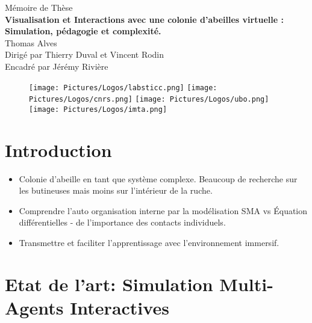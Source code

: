 \documentclass[10pt,a4paper]{article}
\begin{document}
	\begin{titlepage}
		\begin{center}
		\Large Mémoire de Thèse\\
		\vspace{4em}
		\LARGE\textbf{Visualisation et Interactions avec une colonie d'abeilles virtuelle :\\}
		\vspace{1em}
		\Large\textbf{Simulation, pédagogie et complexité.\\}		
		\vspace{8em}
		\LARGE Thomas Alves\\
		\vspace{8em}
		\Large Dirigé par Thierry Duval et Vincent Rodin\\
		Encadré par Jérémy Rivière\\
		\vspace{7em}
		\begin{figure}[!h]
		\centering
		\texttt{[image: Pictures/Logos/labsticc.png]}
		\hspace{0.4cm}
		\texttt{[image: Pictures/Logos/cnrs.png]}
		\hspace{0.4cm}
		\texttt{[image: Pictures/Logos/ubo.png]}
		\hspace{0.4cm}
		\texttt{[image: Pictures/Logos/imta.png]}
		\end{figure}
		\end{center}	 
	\end{titlepage}
	
\tableofcontents
	
\section{Introduction}
\begin{itemize}
	\item Colonie d'abeille en tant que système complexe. Beaucoup de recherche sur les butineuses mais moins sur l'intérieur de la ruche.	
	\item Comprendre l'auto organisation interne par la modélisation SMA vs Équation différentielles - de l'importance des contacts individuels.	
	\item Transmettre et faciliter l'apprentissage avec l'environnement immersif.
\end{itemize}
\section{Etat de l'art: Simulation Multi-Agents Interactives}
\end{document}
